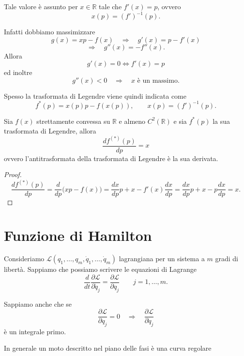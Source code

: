 Tale valore è assunto per \(x\in\mathbb{R}\) tale che \(f'(x)=p\), ovvero
\[
x(p)=(f')^{-1}(p).
\]

Infatti dobbiamo massimizzare
\[
g(x)=xp-f(x)
\quad \Rightarrow \quad
g'(x)=p-f'(x)
\]
\[
\Rightarrow \quad
g''(x)=-f''(x).
\]
Allora
\[
g'(x)=0 \Longleftrightarrow f'(x)=p
\]
ed inoltre
\[
g''(x)<0 \quad \Rightarrow \quad x \text{ è un massimo}.
\]

Spesso la trasformata di Legendre viene quindi indicata come
\[
f^*(p)=x(p)p-f(x(p)),
\qquad
x(p)=(f')^{-1}(p).
\]

\begin{proposition}{}
Sia \(f(x)\) strettamente convessa su \(\mathbb{R}\) e almeno \(C^2(\mathbb{R})\) e sia \(f^*(p)\) la sua trasformata di Legendre, allora
\[
\frac{d f^{(*)}(p)}{dp}=x
\]
ovvero l'antitrasformata della trasformata di Legendre è la sua derivata.
\end{proposition}

\begin{proof}
\[
\frac{d f^{(*)}(p)}{dp}
=
\frac{d}{dp}\bigl(xp-f(x)\bigr)
=
\frac{dx}{dp}p+x-f'(x)\frac{dx}{dp}
=
\frac{dx}{dp}p+x-p\frac{dx}{dp}
=
x.
\]
\end{proof}

\section{Funzione di Hamilton}

Consideriamo \(\mathcal{L}(q_1,\ldots,q_m,\dot q_1,\ldots,\dot q_m)\) lagrangiana per un sistema a \(m\) gradi di libertà.
Sappiamo che possiamo scrivere le equazioni di Lagrange
\[
\frac{d}{dt}\frac{\partial \mathcal{L}}{\partial \dot q_j}
=
\frac{\partial \mathcal{L}}{\partial q_j}
\qquad
j=1,\ldots,m.
\]

Sappiamo anche che se
\[
\frac{\partial \mathcal{L}}{\partial q_j}=0
\quad \Rightarrow \quad
\frac{\partial \mathcal{L}}{\partial \dot q_j}
\]
è un integrale primo.

In generale un moto descritto nel piano delle fasi è una curva regolare

\begin{center}
\end{center}

